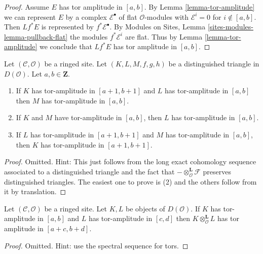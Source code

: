 \begin{proof}
Assume $E$ has tor amplitude in $[a, b]$. By
Lemma \ref{lemma-tor-amplitude}
we can represent $E$ by a complex
$\mathcal{E}^\bullet$ of flat $\mathcal{O}$-modules with
$\mathcal{E}^i = 0$ for $i \not \in [a, b]$. Then
$Lf^*E$ is represented by $f^*\mathcal{E}^\bullet$.
By Modules on Sites, Lemma \ref{sites-modules-lemma-pullback-flat}
the modules $f^*\mathcal{E}^i$ are flat.
Thus by Lemma \ref{lemma-tor-amplitude}
we conclude that $Lf^*E$ has tor amplitude in $[a, b]$.
\end{proof}

\begin{lemma}
\label{lemma-cone-tor-amplitude}
Let $(\mathcal{C}, \mathcal{O})$ be a ringed site.
Let $(K, L, M, f, g, h)$ be a distinguished
triangle in $D(\mathcal{O})$. Let $a, b \in \mathbf{Z}$.
\begin{enumerate}
\item If $K$ has tor-amplitude in $[a + 1, b + 1]$ and
$L$ has tor-amplitude in $[a, b]$ then $M$ has
tor-amplitude in $[a, b]$.
\item If $K$ and $M$ have tor-amplitude in $[a, b]$, then
$L$ has tor-amplitude in $[a, b]$.
\item If $L$ has tor-amplitude in $[a + 1, b + 1]$
and $M$ has tor-amplitude in $[a, b]$, then
$K$ has tor-amplitude in $[a + 1, b + 1]$.
\end{enumerate}
\end{lemma}

\begin{proof}
Omitted. Hint: This just follows from the long exact cohomology sequence
associated to a distinguished triangle and the fact that
$- \otimes_\mathcal{O}^{\mathbf{L}} \mathcal{F}$
preserves distinguished triangles.
The easiest one to prove is (2) and the others follow from it by
translation.
\end{proof}

\begin{lemma}
\label{lemma-tensor-tor-amplitude}
Let $(\mathcal{C}, \mathcal{O})$ be a ringed site. Let $K, L$ be objects of
$D(\mathcal{O})$. If $K$ has tor-amplitude in $[a, b]$ and
$L$ has tor-amplitude in $[c, d]$ then $K \otimes_\mathcal{O}^\mathbf{L} L$
has tor amplitude in $[a + c, b + d]$.
\end{lemma}

\begin{proof}
Omitted. Hint: use the spectral sequence for tors.
\end{proof}


